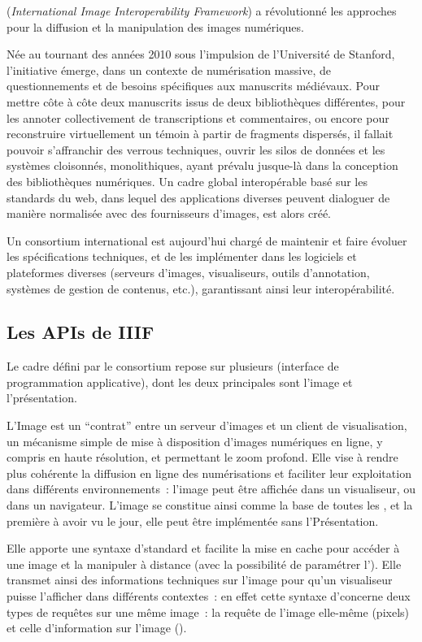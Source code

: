 \iiif (\textit{International Image Interoperability Framework}) a révolutionné les
approches pour la diffusion et la manipulation des images numériques.

Née au tournant des années 2010 sous l'impulsion de l'Université de
Stanford, l'initiative émerge, dans un contexte de numérisation massive,
de questionnements et de besoins spécifiques aux manuscrits médiévaux.
Pour mettre côte à côte deux manuscrits issus de deux bibliothèques
différentes, pour les annoter collectivement de transcriptions et
commentaires, ou encore pour reconstruire virtuellement un témoin à
partir de fragments dispersés, il fallait pouvoir s'affranchir des
verrous techniques, ouvrir les silos de données et les systèmes
cloisonnés, monolithiques, ayant prévalu jusque-là dans la conception
des bibliothèques numériques. Un cadre global interopérable basé sur les
standards du web, dans lequel des applications diverses peuvent
dialoguer de manière normalisée avec des fournisseurs d'images, est alors
créé.

Un consortium international est aujourd'hui chargé de maintenir et faire
évoluer les spécifications techniques, et de les implémenter dans les
logiciels et plateformes diverses (serveurs d'images, visualiseurs,
outils d'annotation, systèmes de gestion de contenus, etc.),
garantissant ainsi leur interopérabilité.

\hypertarget{les-apis-de-iiif}{%
\subsection{Les APIs de IIIF}\label{les-apis-de-iiif}}

Le cadre défini par le consortium \iiif repose sur plusieurs \apis
(interface de programmation applicative), dont les deux principales sont
l'\api image et l'\api présentation.

L'\api Image est un ``contrat'' entre un serveur d'images et un client de
visualisation, un mécanisme simple de mise à disposition d'images numériques en
ligne, y compris en haute résolution, et permettant le zoom profond.
Elle vise à rendre plus cohérente la diffusion en ligne des
numérisations et faciliter leur exploitation dans différents
environnements~: l'image peut être aﬀichée dans un visualiseur, ou dans
un navigateur. L'\api image se constitue ainsi comme la base de toutes
les \apis \iiif, et la première à avoir vu le jour, elle peut être
implémentée sans l'\api Présentation.

Elle apporte une syntaxe d'\URL standard et facilite la mise en cache
pour accéder à une image et la manipuler à distance (avec la possibilité
de paramétrer l'\URL). Elle transmet ainsi des informations techniques sur
l'image pour qu'un visualiseur puisse l'afficher dans différents
contextes~: en effet cette syntaxe d'\URL concerne deux types de requêtes
sur une même image~: la requête de l'image elle-même (pixels) et celle
d'information sur l'image (\json).

